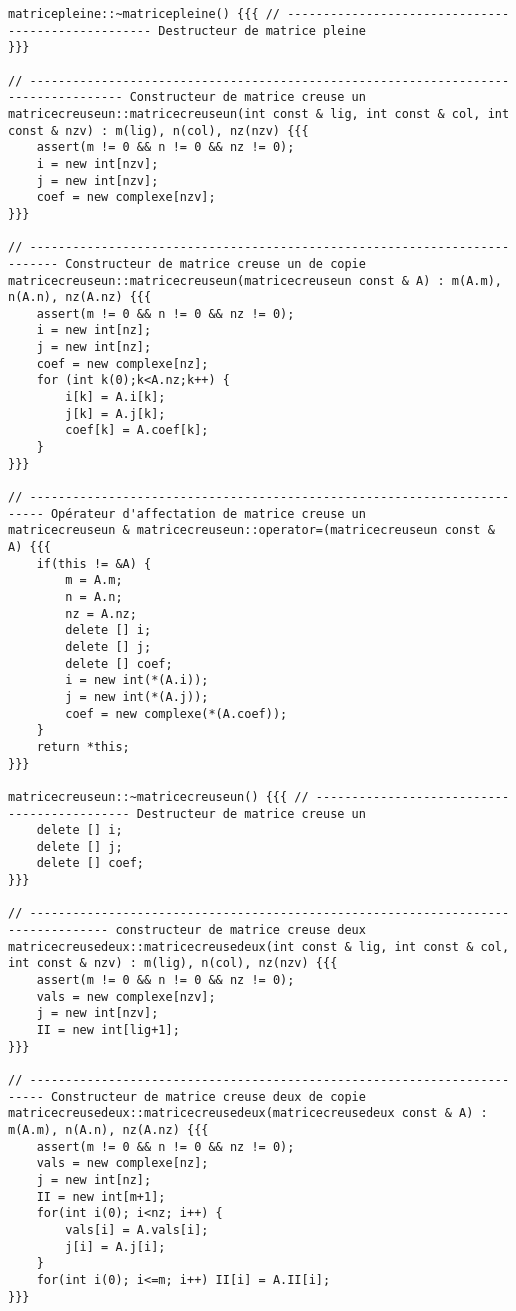 \documentclass[a4paper]{article}
\begin{document}
\begin{verbatim}
matricepleine::~matricepleine() {{{ // --------------------------------------------------- Destructeur de matrice pleine
}}}

// ----------------------------------------------------------------------------------- Constructeur de matrice creuse un
matricecreuseun::matricecreuseun(int const & lig, int const & col, int const & nzv) : m(lig), n(col), nz(nzv) {{{ 
    assert(m != 0 && n != 0 && nz != 0);
    i = new int[nzv];
    j = new int[nzv];
    coef = new complexe[nzv];
}}}

// -------------------------------------------------------------------------- Constructeur de matrice creuse un de copie
matricecreuseun::matricecreuseun(matricecreuseun const & A) : m(A.m), n(A.n), nz(A.nz) {{{ 
    assert(m != 0 && n != 0 && nz != 0);
    i = new int[nz];
    j = new int[nz];
    coef = new complexe[nz];
    for (int k(0);k<A.nz;k++) {
        i[k] = A.i[k];
        j[k] = A.j[k];
        coef[k] = A.coef[k];
    }
}}}

// ------------------------------------------------------------------------ Opérateur d'affectation de matrice creuse un
matricecreuseun & matricecreuseun::operator=(matricecreuseun const & A) {{{ 
    if(this != &A) {
        m = A.m;
        n = A.n;
        nz = A.nz;
        delete [] i;
        delete [] j;
        delete [] coef;
        i = new int(*(A.i));
        j = new int(*(A.j));
        coef = new complexe(*(A.coef));
    }
    return *this;
}}}

matricecreuseun::~matricecreuseun() {{{ // -------------------------------------------- Destructeur de matrice creuse un
    delete [] i;
    delete [] j;
    delete [] coef;
}}}

// --------------------------------------------------------------------------------- constructeur de matrice creuse deux
matricecreusedeux::matricecreusedeux(int const & lig, int const & col, int const & nzv) : m(lig), n(col), nz(nzv) {{{ 
    assert(m != 0 && n != 0 && nz != 0);
    vals = new complexe[nzv];
    j = new int[nzv];
    II = new int[lig+1];
}}}

// ------------------------------------------------------------------------ Constructeur de matrice creuse deux de copie
matricecreusedeux::matricecreusedeux(matricecreusedeux const & A) : m(A.m), n(A.n), nz(A.nz) {{{ 
    assert(m != 0 && n != 0 && nz != 0);
    vals = new complexe[nz];
    j = new int[nz];
    II = new int[m+1];
    for(int i(0); i<nz; i++) {
        vals[i] = A.vals[i];
        j[i] = A.j[i];
    }
    for(int i(0); i<=m; i++) II[i] = A.II[i];
}}}


\end{verbatim}
\end{document}
